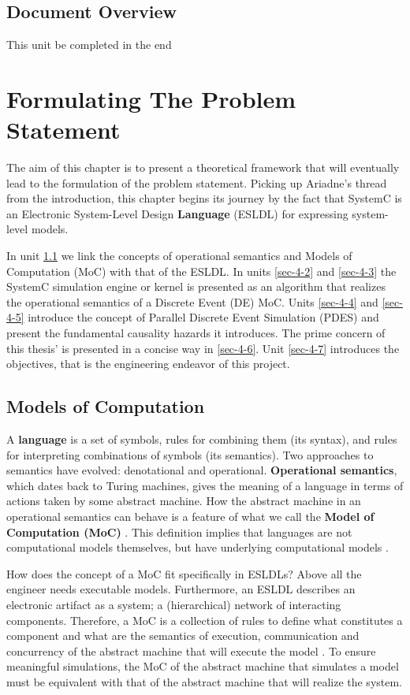 \documentclass[12pt,twoside]{article}
\begin{document}
\subsection{Document Overview}
\label{sec-3-6}
This unit be completed in the end
\clearpage



\section{Formulating The Problem Statement}
\label{sec-4}
The aim of this chapter is to present a theoretical framework that will eventually lead to the formulation of the problem statement.
Picking up Ariadne's thread from the introduction, this chapter begins its journey by the fact that SystemC is an Electronic System-Level Design \textbf{Language} (ESLDL) for expressing system-level models.

In unit \ref{sec-4-1} we link the concepts of operational semantics and Models of Computation (MoC) with that of the ESLDL.
In units \ref{sec-4-2} and \ref{sec-4-3} the SystemC simulation engine or kernel is presented as an algorithm that realizes the operational semantics of a Discrete Event (DE) MoC.
Units \ref{sec-4-4} and \ref{sec-4-5} introduce the concept of Parallel Discrete Event Simulation (PDES) and present the fundamental causality hazards it introduces.
The prime concern of this thesis' is presented in a concise way in \ref{sec-4-6}.
Unit \ref{sec-4-7} introduces the objectives, that is the engineering endeavor of this project.

\subsection{Models of Computation}
\label{sec-4-1}
A \textbf{language} is a set of symbols, rules for combining them (its syntax), and rules for interpreting combinations of symbols (its semantics). 
Two approaches to semantics have evolved: denotational and operational.
\textbf{Operational semantics}, which dates back to Turing machines, gives the meaning of a language in terms of actions taken by some abstract machine. 
How the abstract machine in an operational semantics can behave is a feature of what we call the \textbf{Model of Computation (MoC)} \cite{Edwards1997}.
This definition implies that languages are not computational models themselves, but have underlying computational models \cite{Jantsch2005}.

How does the concept of a MoC fit specifically in ESLDLs?
Above all the engineer needs executable models.
Furthermore, an ESLDL describes an electronic artifact as a system; a (hierarchical) network of interacting components.
Therefore, a MoC is a collection of rules to define what constitutes a component and what are the semantics of execution, communication and concurrency of the abstract machine that will execute the model \cite{Jantsch2005} \cite{Editor2014}.
To ensure meaningful simulations, the MoC of the abstract machine that simulates a model must be equivalent with that of the abstract machine that will realize the system.
\end{document}
